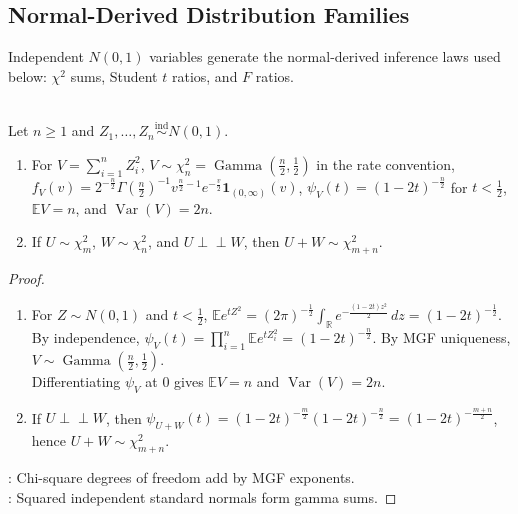 \subsection{Normal-Derived Distribution Families}

Independent $N(0,1)$ variables generate the normal-derived inference laws used below: $\chi^2$ sums, Student $t$ ratios, and $F$ ratios.

\begin{proposition} \label{prop:chi-square-normal-sums} \\
Let $n\geq1$ and $Z_1,\ldots,Z_n\overset{\mathrm{ind}}{\sim}N(0,1)$.
\begin{enumerate}[label=(\roman*)]
\setlength{\itemsep}{0pt}
\item For $V=\sum\limits_{i=1}^nZ_i^2$, $V\sim\chi_n^2=\operatorname{Gamma}(\frac{n}{2},\frac{1}{2})$ in the rate convention,\\
$f_V(v)=2^{-\frac{n}{2}}\Gamma(\frac{n}{2})^{-1}v^{\frac{n}{2}-1}e^{-\frac{v}{2}}\mathbf{1}_{(0,\infty)}(v)$, $\psi_V(t)=(1-2t)^{-\frac{n}{2}}$ for $t<\frac{1}{2}$, $\mathbb{E}V=n$, and $\operatorname{Var}(V)=2n$.
\item If $U\sim\chi_m^2$, $W\sim\chi_n^2$, and $U\perp\!\!\!\perp W$, then $U+W\sim\chi_{m+n}^2$.
\end{enumerate}
\begin{proof}
\begin{enumerate}[label=(\roman*)]
\setlength{\itemsep}{0pt}
\item
For $Z\sim N(0,1)$ and $t<\frac{1}{2}$, $\mathbb{E}e^{tZ^2}=(2\pi)^{-\frac{1}{2}}\int_{\mathbb{R}}e^{-\frac{(1-2t)z^2}{2}}\,dz=(1-2t)^{-\frac{1}{2}}$.\\
By independence, $\psi_V(t)=\prod\limits_{i=1}^n\mathbb{E}e^{tZ_i^2}=(1-2t)^{-\frac{n}{2}}$.
By MGF uniqueness, $V\sim\operatorname{Gamma}(\frac{n}{2},\frac{1}{2})$.\\
Differentiating $\psi_V$ at $0$ gives $\mathbb{E}V=n$ and $\operatorname{Var}(V)=2n$.
\item If $U\perp\!\!\!\perp W$, then $\psi_{U+W}(t)=(1-2t)^{-\frac{m}{2}}(1-2t)^{-\frac{n}{2}}=(1-2t)^{-\frac{m+n}{2}}$, hence $U+W\sim\chi_{m+n}^2$.
\end{enumerate}
: Chi-square degrees of freedom add by MGF exponents.\\
: Squared independent standard normals form gamma sums.
\end{proof}
\end{proposition}

